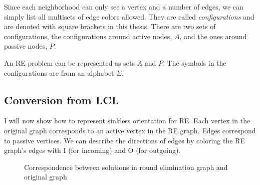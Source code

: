 \documentclass[english, 12pt, a4paper, sci, a-1b, online]{aaltothesis}
\begin{document}
Since each neighborhood can only see a vertex and a number of edges, we can simply list all multisets of edge colors allowed. They are called \emph{configurations} and are denoted with square brackets in this thesis. There are two sets of configurations, the configurations around active nodes, $A$, and the ones around passive nodes, $P$.

An RE problem can be represented as sets $A$ and $P$. The symbols in the configurations are from an alphabet $\Sigma$.

\subsection{Conversion from LCL}

I will now show how to represent sinkless orientation for RE. Each vertex in the original graph corresponds to an active vertex in the RE graph. Edges correspond to passive vertices. We can describe the directions of edges by coloring the RE graph's edges with I (for incoming) and O (for outgoing).

\begin{figure}[h]
\centering
{}
\caption{Correspondence between solutions in round elimination graph and original graph}
\end{figure}
\end{document}
